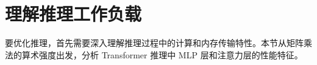 \section{理解推理工作负载}

要优化推理，首先需要深入理解推理过程中的计算和内存传输特性。本节从矩阵乘法的算术强度出发，分析 Transformer 推理中 MLP 层和注意力层的性能特征。

